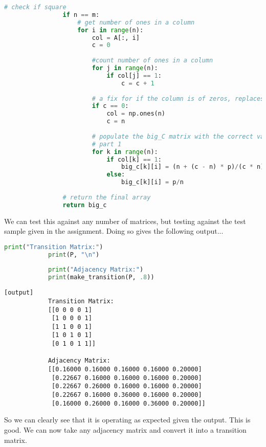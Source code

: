 \documentclass[11pt]{article}
\begin{document}
\begin{enumerate}
\begin{lstlisting}[style=mystyle, linewidth=0.94\linewidth,
                           language=Python, gobble=8, caption=make\_transition]
                # check if square
                if n == m:
                    # get number of ones in a column
                    for i in range(n):
                        col = A[:, i]
                        c = 0
            
                        #count number of ones in a column
                        for j in range(n):
                            if col[j] == 1:
                                c = c + 1
            
                        # a fix for if the column is of zeros, replaces with one
                        if c == 0:
                            col = np.ones(n)
                            c = n
            
                        # populate the big_C matrix with the correct values given
                        # part 1
                        for k in range(n):
                            if col[k] == 1:
                                big_c[k][i] = (n + (c - n) * p)/(c * n)
                            else:
                                big_c[k][i] = p/n
                                
                # return the final array
                return big_c
        \end{lstlisting} 

        We can test this against any number of matrices, but testing against
        the test sample given in the assignment. Doing so gives the following
        output...
        \begin{lstlisting}[style=mystyle, linewidth=0.92\linewidth,
                           language=Python, gobble=8, caption=testing
                           make\_transition]
            print("Transition Matrix:")
            print(P, "\n")
            
            print("Adjacency Matrix:")
            print(make_transition(P, .8))
        \end{lstlisting}
        \newpage
        \begin{verbatim}[output]
            Transition Matrix:
            [[0 0 0 0 1]
             [1 0 0 0 1]
             [1 1 0 0 1]
             [1 0 1 0 1]
             [0 1 0 1 1]] 
            
            Adjacency Matrix:
            [[0.16000 0.16000 0.16000 0.16000 0.20000]
             [0.22667 0.16000 0.16000 0.16000 0.20000]
             [0.22667 0.26000 0.16000 0.16000 0.20000]
             [0.22667 0.16000 0.36000 0.16000 0.20000]
             [0.16000 0.26000 0.16000 0.36000 0.20000]]
        \end{verbatim}
        So we can clearly see that it is operating as expected given the
        output. This is good. We can now take any adjacency matrix and convert
        it into a transition matrix.
        

\end{enumerate}
\end{document}
